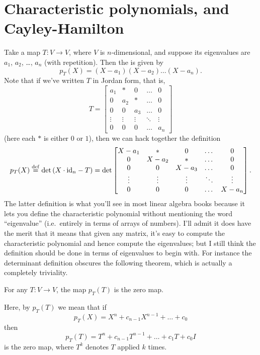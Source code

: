 \section{Characteristic polynomials, and Cayley-Hamilton}
Take a map $T : V \to V$, where $V$ is $n$-dimensional, and suppose its eigenvalues
are $a_1$, $a_2$, \dots, $a_n$ (with repetition).
Then the  is given by
\[
	p_T(X) = (X-a_1)(X-a_2) \dots (X-a_n).
\]
Note that if we've written $T$ in Jordan form, that is,
\[
	T = \begin{bmatrix}
		a_1 & \ast & 0 & \dots & 0 \\
		0 & a_2 & \ast & \dots & 0 \\
		0 & 0 & a_3 & \dots & 0 \\
		\vdots & \vdots & \vdots & \ddots & \vdots \\
		0 & 0 & 0 & \dots & a_n
	\end{bmatrix}
\]
(here each $\ast$ is either $0$ or $1$),
then we can hack together the definition
\[
	p_T(X) \overset{\mathrm{def}}{=}
	\det \left( X \cdot \mathrm{id}_n - T \right)
	= \det \begin{bmatrix}
		X - a_1 & \ast & 0 & \dots & 0 \\
		0 & X - a_2 & \ast & \dots & 0 \\
		0 & 0 & X - a_3 & \dots & 0 \\
		\vdots & \vdots & \vdots & \ddots & \vdots \\
		0 & 0 & 0 & \dots & X - a_n
	\end{bmatrix}.
\]
The latter definition is what you'll see in most
linear algebra books because it lets you define the characteristic polynomial
without mentioning the word ``eigenvalue''
(i.e.\ entirely in terms of arrays of numbers).
I'll admit it does have the merit that it means that given any matrix,
it's easy to compute the characteristic polynomial and hence
compute the eigenvalues;
but I still think the definition should be done in terms of
eigenvalues to begin with.
For instance the determinant definition obscures the following theorem,
which is actually a completely triviality.
\begin{theorem}
	For any $T : V \to V$,
	the map $p_T(T)$ is the zero map.
\end{theorem}
Here, by $p_T(T)$ we mean that if \[ p_T(X) = X^n + c_{n-1} X^{n-1} + \dots + c_0 \]
then \[ p_T(T) = T^n + c_{n-1} T^{n-1} + \dots + c_1 T +  c_0 I \]
is the zero map,
where $T^k$ denotes $T$ applied $k$ times.

